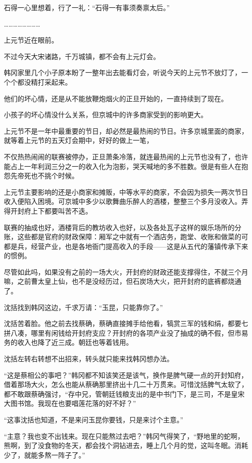 石得一心里想着，行了一礼：“石得一有事须奏禀太后。”

……………………

上元节近在眼前。

不过今天大宋诸路，千万城镇，都不会有上元灯会。

韩冈家里几个小子原本盼了一整年出去能看灯会，听说今天的上元节不放灯了，一个个都没精打采起来。

他们的坏心情，还是从不能放鞭炮烟火的正旦开始的，一直持续到了现在。

小孩子的坏心情没什么关系，但京城中的许多商家受到的影响更大。

上元节不是一年中最重要的节日，却必然是最热闹的节日。许多京城里面的商家，就等着上元节的五天灯会期中，好好的做上一笔，

不仅热热闹闹的联赛被停办，正旦萧条冷落，就连最热闹的上元节也没有了，也许能占上一年利润三分之一的收入化为泡影，哭天喊地的多不胜数。很是有些人在抱怨先帝死也不挑个时候。

上元节主要影响的还是小商家和摊贩，中等水平的商家，不会因为损失一两次节日收入便陷入困境。可京城中多少以歌舞曲乐醉人的酒楼，整整三个多月没收入。弄得开封府上下都要叫苦不迭。

联赛的抽成也好，酒楼背后的教坊收入也好，以及各处瓦子这样的娱乐场所的分账，这些都是官府的财政保障：厢军之中就有一个酒店务，跑堂、收账和做菜的可都是兵，经营产业，也是各地衙门提高收入的手段——这是从五代的藩镇传承下来的惯例。

尽管如此吗，如果没有之前的一场大火，开封府的财政还能支撑得住，不就三个月嘛，之前曹太皇上仙，也不是没经历过，但石炭场大火，把开封府的底裤都烧通了。

沈括找到韩冈这边，千求万请：“玉昆，只能靠你了。”

沈括苦着脸。他之前去找蔡确，蔡确直接摊手给他看，犒赏三军的钱和绢，都要七拼八凑，哪里有闲钱给开封府支应？开封府的各项产业没了抽成的确不假，但市易务的收入也降了近三成。朝廷也等着钱用。

沈括左转右转想不出招来，转头就只能来找韩冈想办法。

“这是蔡相公的事吧？”韩冈都不知该笑还是该气，换作是脾气硬一点的开封知府，借着那场大火，怎么也能从蔡确那里挤出十几二十万贯来。可惜沈括脾气太软了，都不敢跟蔡确强讨，“存中兄，管朝廷钱粮支出的是中书门下，是三司，不是皇宋大图书馆。我现在也要唱莲花落的好不好？”

“这事沈括也知道，不是来问玉昆你要钱，只是来讨个主意。”

“主意？我也变不出钱来。现在只能熬过去吧？”韩冈气得笑了，“野地里的蛇啊，熊啊，到了没食物的冬天，都会找个洞钻进去，睡上几个月的觉，这叫冬眠。消耗少了，就能多熬一阵子了。”

